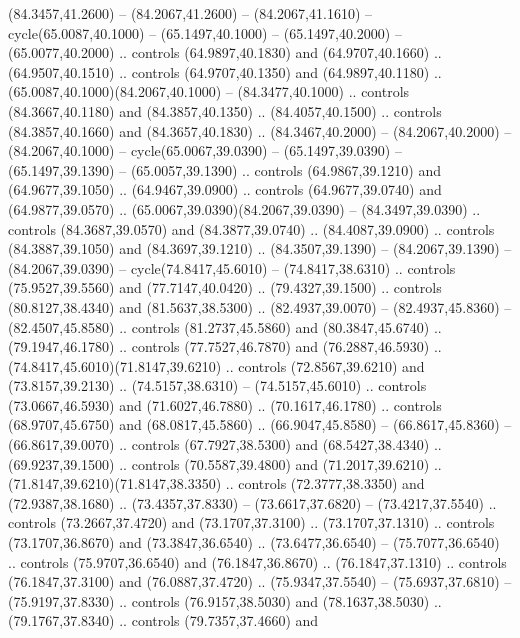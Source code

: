 \begin{scope}[cm={{1.25,0.0,0.0,-1.25,(-71.74049,81.13304)}}]
        (84.3457,41.2600) -- (84.2067,41.2600) -- (84.2067,41.1610) --
        cycle(65.0087,40.1000) -- (65.1497,40.1000) -- (65.1497,40.2000) --
        (65.0077,40.2000) .. controls (64.9897,40.1830) and (64.9707,40.1660) ..
        (64.9507,40.1510) .. controls (64.9707,40.1350) and (64.9897,40.1180) ..
        (65.0087,40.1000)(84.2067,40.1000) -- (84.3477,40.1000) .. controls
        (84.3667,40.1180) and (84.3857,40.1350) .. (84.4057,40.1500) .. controls
        (84.3857,40.1660) and (84.3657,40.1830) .. (84.3467,40.2000) --
        (84.2067,40.2000) -- (84.2067,40.1000) -- cycle(65.0067,39.0390) --
        (65.1497,39.0390) -- (65.1497,39.1390) -- (65.0057,39.1390) .. controls
        (64.9867,39.1210) and (64.9677,39.1050) .. (64.9467,39.0900) .. controls
        (64.9677,39.0740) and (64.9877,39.0570) .. (65.0067,39.0390)(84.2067,39.0390)
        -- (84.3497,39.0390) .. controls (84.3687,39.0570) and (84.3877,39.0740) ..
        (84.4087,39.0900) .. controls (84.3887,39.1050) and (84.3697,39.1210) ..
        (84.3507,39.1390) -- (84.2067,39.1390) -- (84.2067,39.0390) --
        cycle(74.8417,45.6010) -- (74.8417,38.6310) .. controls (75.9527,39.5560) and
        (77.7147,40.0420) .. (79.4327,39.1500) .. controls (80.8127,38.4340) and
        (81.5637,38.5300) .. (82.4937,39.0070) -- (82.4937,45.8360) --
        (82.4507,45.8580) .. controls (81.2737,45.5860) and (80.3847,45.6740) ..
        (79.1947,46.1780) .. controls (77.7527,46.7870) and (76.2887,46.5930) ..
        (74.8417,45.6010)(71.8147,39.6210) .. controls (72.8567,39.6210) and
        (73.8157,39.2130) .. (74.5157,38.6310) -- (74.5157,45.6010) .. controls
        (73.0667,46.5930) and (71.6027,46.7880) .. (70.1617,46.1780) .. controls
        (68.9707,45.6750) and (68.0817,45.5860) .. (66.9047,45.8580) --
        (66.8617,45.8360) -- (66.8617,39.0070) .. controls (67.7927,38.5300) and
        (68.5427,38.4340) .. (69.9237,39.1500) .. controls (70.5587,39.4800) and
        (71.2017,39.6210) .. (71.8147,39.6210)(71.8147,38.3350) .. controls
        (72.3777,38.3350) and (72.9387,38.1680) .. (73.4357,37.8330) --
        (73.6617,37.6820) -- (73.4217,37.5540) .. controls (73.2667,37.4720) and
        (73.1707,37.3100) .. (73.1707,37.1310) .. controls (73.1707,36.8670) and
        (73.3847,36.6540) .. (73.6477,36.6540) -- (75.7077,36.6540) .. controls
        (75.9707,36.6540) and (76.1847,36.8670) .. (76.1847,37.1310) .. controls
        (76.1847,37.3100) and (76.0887,37.4720) .. (75.9347,37.5540) --
        (75.6937,37.6810) -- (75.9197,37.8330) .. controls (76.9157,38.5030) and
        (78.1637,38.5030) .. (79.1767,37.8340) .. controls (79.7357,37.4660) and

\end{scope}
